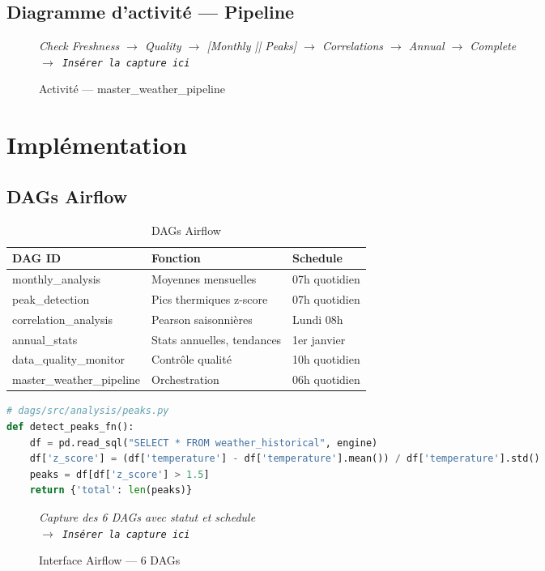 \documentclass[a4paper,12pt,oneside]{report}
\newcommand{\imgplaceholder}[2]{%
  \begin{tcolorbox}[colback=blue!5,colframe=blue!40,title=#1]
    \centering\itshape #2\\[6pt]
    \texttt{$\rightarrow$ Insérer la capture ici}
  \end{tcolorbox}
}
\begin{document}
\subsection{Diagramme d'activité — Pipeline}
\begin{figure}[H]\centering
\imgplaceholder{Activité pipeline}{Check Freshness $\rightarrow$ Quality $\rightarrow$ [Monthly || Peaks] $\rightarrow$ Correlations $\rightarrow$ Annual $\rightarrow$ Complete}
\caption{Activité — master\_weather\_pipeline}\label{fig:activity_pipeline}\end{figure}

\section{Implémentation}

\subsection{DAGs Airflow}
\begin{table}[H]\centering\caption{DAGs Airflow}\label{tab:dags}
\begin{tabularx}{\textwidth}{lXl}\toprule
\textbf{DAG ID} & \textbf{Fonction} & \textbf{Schedule} \\\midrule
monthly\_analysis & Moyennes mensuelles & 07h quotidien \\
peak\_detection & Pics thermiques z-score & 07h quotidien \\
correlation\_analysis & Pearson saisonnières & Lundi 08h \\
annual\_stats & Stats annuelles, tendances & 1er janvier \\
data\_quality\_monitor & Contrôle qualité & 10h quotidien \\
master\_weather\_pipeline & Orchestration & 06h quotidien \\\bottomrule
\end{tabularx}\end{table}

\begin{lstlisting}[language=Python,caption={Architecture modulaire des DAGs}]
# dags/src/analysis/peaks.py
def detect_peaks_fn():
    df = pd.read_sql("SELECT * FROM weather_historical", engine)
    df['z_score'] = (df['temperature'] - df['temperature'].mean()) / df['temperature'].std()
    peaks = df[df['z_score'] > 1.5]
    return {'total': len(peaks)}
\end{lstlisting}

\begin{figure}[H]\centering
\imgplaceholder{Interface Airflow}{Capture des 6 DAGs avec statut et schedule}
\caption{Interface Airflow — 6 DAGs}\label{fig:airflow_ui}\end{figure}
\end{document}
